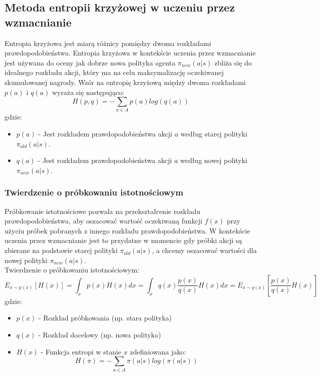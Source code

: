 \documentclass[a4paper, 12pt]{article}
\begin{document}
    \subsection{Metoda entropii krzyżowej w uczeniu przez wzmacnianie}
    Entropia krzyżowa jest miarą różnicy pomiędzy dwoma rozkładami prawdopodobieństwa. Entropia krzyżowa w kontekście uczenia przez wzmacnianie
    jest używana do oceny jak dobrze nowa polityka agenta \( \pi_{new}(a|s) \) zbliża się do idealnego rozkładu akcji, który ma na celu maksymalizację oczekiwanej skumulowanej nagrody.
    Wzór na entropię krzyżową między dwoma rozkładami \( p(a) \) i \( q(a) \) wyraża się następująco:
    \[ H(p,q) = - \sum_{a \in A} p(a) log(q(a)) \]
    gdzie:
    \begin{itemize}
        \item \( p(a) \) - Jest rozkładem prawdopodobieństwa akcji \( a \) według starej polityki \( \pi_{old}(a|s) \).
        \item \( q(a) \) - Jest rozkładem prawdopodobieństwa akcji \( a \) według nowej polityki \( \pi_{new} (a|s) \).
    \end{itemize} 
    \subsubsection{Twierdzenie o próbkowaniu istotnościowym}
    Próbkowanie istotnościowe pozwala na przekształcenie rozkładu prawdopodobieństwa, aby oszacować wartość oczekiwaną funkcji \( f(x) \) przy
    użyciu próbek pobranych z innego rozkładu prawdopodobieństwa. W kontekście uczenia przez wzmacnianie jest to przydatne w momencie gdy
    próbki akcji są zbierane na podstawie starej polityki \( \pi_{old}(a|s) \), a chcemy oszacować wartości dla nowej polityki \( \pi_{new} (a|s) \).
    \\ Twierdzenie o próbkowaniu istotnościowym:
    \[ E_{x \sim p(x)} [H(x)] = \int_{x} p(x)H(x) dx = \int_{x} q(x) \frac{p(x)}{q(x)} H(x) dx = E_{x \sim q(x)} [\frac{p(x)}{q(x)}H(x)]\] 
    gdzie:
    \begin{itemize}
        \item \( p(x) \) - Rozkład próbkowania (np. stara polityka)
        \item \( q(x) \) - Rozkład docelowy (np. nowa polityka)
        \item \( H(x) \) - Funkcja entropi w stanie \( x \) zdefiniowana jako:
        \[ H(\pi) = - \sum_{a \in A} \pi(a|s)log(\pi(a|s)) \]
    \end{itemize}
\end{document}
